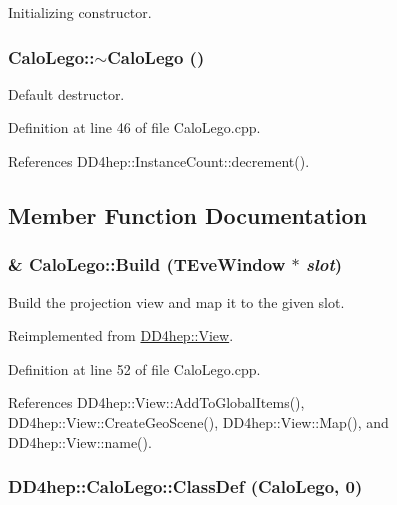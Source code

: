 Initializing constructor. \hypertarget{class_d_d4hep_1_1_calo_lego_a8416ec621ced1b3b415e48da1cd5c45b}{
\subsubsection[{$\sim$CaloLego}]{\setlength{\rightskip}{0pt plus 5cm}CaloLego::$\sim$CaloLego ()}}
\label{class_d_d4hep_1_1_calo_lego_a8416ec621ced1b3b415e48da1cd5c45b}


Default destructor. 

Definition at line 46 of file CaloLego.cpp.

References DD4hep::InstanceCount::decrement().

\subsection{Member Function Documentation}
\hypertarget{class_d_d4hep_1_1_calo_lego_ab1ef28e69a78dbe27e6a33b1d22cc713}{
\subsubsection[{Build}]{ \& CaloLego::Build (TEveWindow $\ast$ {\em slot})}}
\label{class_d_d4hep_1_1_calo_lego_ab1ef28e69a78dbe27e6a33b1d22cc713}


Build the projection view and map it to the given slot. 

Reimplemented from \hyperlink{class_d_d4hep_1_1_view_ab4e12874a9cb6a599f268b027443c6ce}{DD4hep::View}.

Definition at line 52 of file CaloLego.cpp.

References DD4hep::View::AddToGlobalItems(), DD4hep::View::CreateGeoScene(), DD4hep::View::Map(), and DD4hep::View::name().\hypertarget{class_d_d4hep_1_1_calo_lego_a1a4c9c092acfa08adb65b7fe594fa7fd}{
\subsubsection[{ClassDef}]{\setlength{\rightskip}{0pt plus 5cm}DD4hep::CaloLego::ClassDef ({\bf CaloLego}, \/  0)}}
\label{class_d_d4hep_1_1_calo_lego_a1a4c9c092acfa08adb65b7fe594fa7fd}


